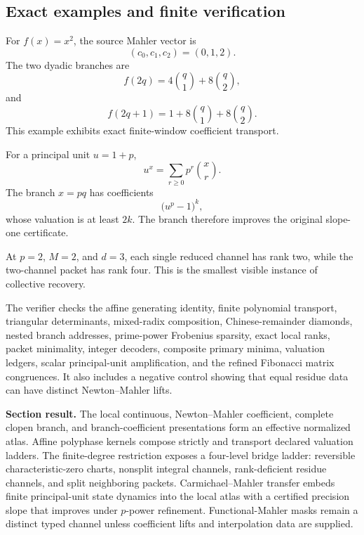 \subsection{Exact examples and finite verification}
\label{subsec:block08-verification}

For \(f(x)=x^2\), the source Mahler vector is
\[
 (c_0,c_1,c_2)=(0,1,2).
\]
The two dyadic branches are
\[
 f(2q)=4\binom q1+8\binom q2,
\]
and
\[
 f(2q+1)=1+8\binom q1+8\binom q2.
\]
This example exhibits exact finite-window coefficient transport.

For a principal unit \(u=1+p\),
\[
 u^x=\sum_{r\geq0}p^r\binom xr.
\]
The branch \(x=pq\) has coefficients
\[
 \bigl(u^p-1\bigr)^k,
\]
whose valuation is at least \(2k\).  The branch therefore improves the original slope-one certificate.

At \(p=2\), \(M=2\), and \(d=3\), each single reduced channel has rank two, while the two-channel packet has rank four.  This is the smallest visible instance of collective recovery.




The verifier checks the affine generating identity, finite polynomial transport, triangular determinants, mixed-radix composition, Chinese-remainder diamonds, nested branch addresses, prime-power Frobenius sparsity, exact local ranks, packet minimality, integer decoders, composite primary minima, valuation ledgers, scalar principal-unit amplification, and the refined Fibonacci matrix congruences.  It also includes a negative control showing that equal residue data can have distinct Newton--Mahler lifts.

\begin{resultbox}
\textbf{Section result.}
The local continuous, Newton--Mahler coefficient, complete clopen branch, and branch-coefficient presentations form an effective normalized atlas.  Affine polyphase kernels compose strictly and transport declared valuation ladders.  The finite-degree restriction exposes a four-level bridge ladder: reversible characteristic-zero charts, nonsplit integral channels, rank-deficient residue channels, and split neighboring packets.  Carmichael--Mahler transfer embeds finite principal-unit state dynamics into the local atlas with a certified precision slope that improves under \(p\)-power refinement.  Functional-Mahler masks remain a distinct typed channel unless coefficient lifts and interpolation data are supplied.
\end{resultbox}
